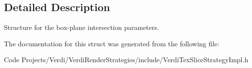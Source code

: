 \subsection{\-Detailed \-Description}
\-Structure for the box-\/plane intersection parameters. 

\-The documentation for this struct was generated from the following file\-:\begin{DoxyCompactItemize}
\item 
\-Code Projects/\-Verdi/\-Verdi\-Render\-Strategies/include/\-Verdi\-Tex\-Slice\-Strategy\-Impl.\-h\end{DoxyCompactItemize}

